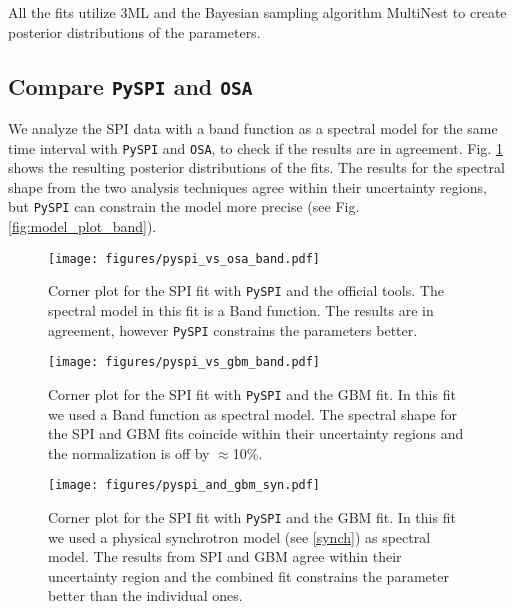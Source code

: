 \documentclass[twocolumn,traditabstract]{aa}
\begin{document}
All the fits utilize 3ML \citep{3ML} and the Bayesian sampling algorithm MultiNest \citep{multinest} to create posterior distributions of the parameters.



\subsection{Compare {\tt PySPI} and {\tt OSA}}
\label{pyspi_osa}
We analyze the SPI data with a band function as a spectral model for the same time interval with {\tt PySPI} and {\tt OSA}, to check if the results are in agreement. Fig. \ref{fig:corner_osa_pyspi_band} shows the resulting posterior distributions of the fits. The results for the spectral shape from the two analysis techniques agree within their uncertainty regions, but {\tt PySPI} can constrain the model more precise (see Fig. \ref{fig:model_plot_band}).

\begin{figure}
  \begin{centering}
    \texttt{[image: figures/pyspi\_vs\_osa\_band.pdf]}
    \caption{Corner plot for the SPI fit with {\tt PySPI} and the official tools. The spectral model in this fit is a Band function. The results are in agreement, however {\tt PySPI} constrains the parameters better.}
    \label{fig:corner_osa_pyspi_band}
  \end{centering}
\end{figure}
\begin{figure}
  \begin{centering}
    \texttt{[image: figures/pyspi\_vs\_gbm\_band.pdf]}
    \caption{Corner plot for the SPI fit with {\tt PySPI} and the GBM fit. In this fit we used a Band function as spectral model. The spectral shape for the SPI and GBM fits coincide within their uncertainty regions and the normalization is off by $\approx$10\%.}
    \label{fig:corner_gbm_pyspi_band}
  \end{centering}
\end{figure}
\begin{figure}
  \begin{centering}
    \texttt{[image: figures/pyspi\_and\_gbm\_syn.pdf]}
    \caption{Corner plot for the SPI fit with {\tt PySPI} and the GBM fit. In this fit we used a physical synchrotron model (see \ref{synch}) as spectral model. The results from SPI and GBM agree within their uncertainty region and the combined fit constrains the parameter better than the individual ones.}
    \label{fig:corner_gbm_pyspi_joined_syn}
  \end{centering}
\end{figure}
\end{document}
